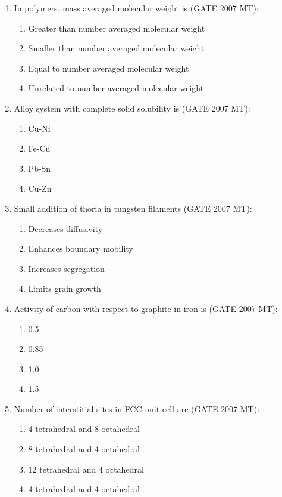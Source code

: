 \documentclass[12pt]{article}
\begin{document}
\begin{enumerate}
\item In polymers, mass averaged molecular weight is (GATE 2007 MT):
    \begin{enumerate}
        \item Greater than number averaged molecular weight
        \item Smaller than number averaged molecular weight
        \item Equal to number averaged molecular weight
        \item Unrelated to number averaged molecular weight
    \end{enumerate}

\item Alloy system with complete solid solubility is (GATE 2007 MT):
    \begin{enumerate}
        \item Cu-Ni
        \item Fe-Cu
        \item Pb-Sn
        \item Cu-Zn
    \end{enumerate}

\item Small addition of thoria in tungsten filaments (GATE 2007 MT):
    \begin{enumerate}
        \item Decreases diffusivity
        \item Enhances boundary mobility
        \item Increases segregation
        \item Limits grain growth
    \end{enumerate}

\item Activity of carbon with respect to graphite in iron is (GATE 2007 MT):
    \begin{enumerate}
        \item 0.5
        \item 0.85
        \item 1.0
        \item 1.5
    \end{enumerate}

\item Number of interstitial sites in FCC unit cell are (GATE 2007 MT):
    \begin{enumerate}
        \item 4 tetrahedral and 8 octahedral
        \item 8 tetrahedral and 4 octahedral
        \item 12 tetrahedral and 4 octahedral
        \item 4 tetrahedral and 4 octahedral
    \end{enumerate}


\end{enumerate}
\end{document}
